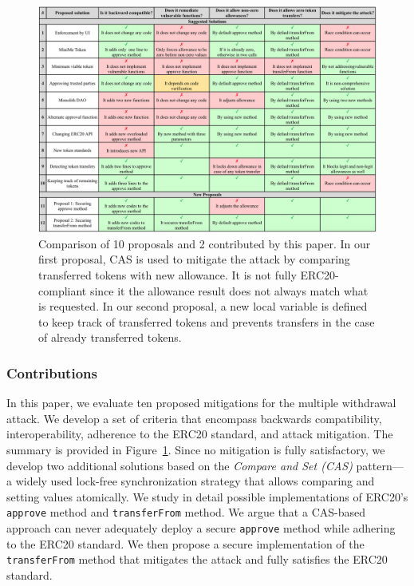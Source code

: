 \begin{figure}[t]
\includegraphics[width=\textwidth]{figures/multiple_withdrawal_04_wide.png}
\caption{Comparison of 10 proposals and 2 contributed by this paper. In our first proposal, CAS is used to mitigate the attack by comparing transferred tokens with new allowance. It is not fully ERC20-compliant since it the allowance result does not always match what is requested. In our second proposal, a new local variable is defined to keep track of transferred tokens and prevents transfers in the case of already transferred tokens.\label{tab:comp}}
\end{figure}

\subsubsection*{Contributions} In this paper, we evaluate ten proposed mitigations for the multiple withdrawal attack. We develop a set of criteria that encompass backwards compatibility, interoperability, adherence to the ERC20 standard, and attack mitigation. The summary is provided in Figure~\ref{tab:comp}. Since no mitigation is fully satisfactory, we develop two additional solutions based on the \textit{Compare and Set (CAS)} pattern\cite{Ref06}---a widely used lock-free synchronization strategy that allows comparing and setting values atomically. We study in detail possible implementations of ERC20's \texttt{approve} method and \texttt{transferFrom} method. We argue that a CAS-based approach can never adequately deploy a secure \texttt{approve} method while adhering to the ERC20 standard. We then propose a secure implementation of the \texttt{transferFrom} method that mitigates the attack and fully satisfies the ERC20 standard. 


